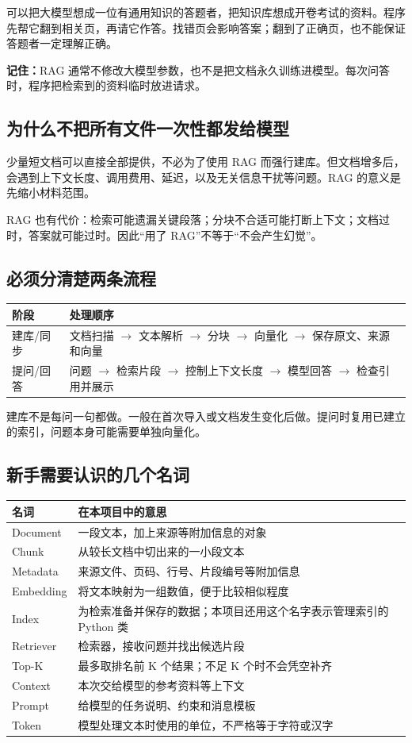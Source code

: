 \documentclass[UTF8,11pt,a4paper,fontset=fandol]{ctexart}
\newcommand{\important}[1]{\par\smallskip\noindent\textbf{记住：}#1\par\smallskip}
\begin{document}
可以把大模型想成一位有通用知识的答题者，把知识库想成开卷考试的资料。程序先帮它翻到相关页，再请它作答。找错页会影响答案；翻到了正确页，也不能保证答题者一定理解正确。

\important{RAG 通常不修改大模型参数，也不是把文档永久训练进模型。每次问答时，程序把检索到的资料临时放进请求。}

\subsection{为什么不把所有文件一次性都发给模型}
少量短文档可以直接全部提供，不必为了使用 RAG 而强行建库。但文档增多后，会遇到上下文长度、调用费用、延迟，以及无关信息干扰等问题。RAG 的意义是先缩小材料范围。

RAG 也有代价：检索可能遗漏关键段落；分块不合适可能打断上下文；文档过时，答案就可能过时。因此“用了 RAG”不等于“不会产生幻觉”。

\subsection{必须分清楚两条流程}
\begin{center}
\begin{tabular}{L{0.17\textwidth}L{0.7\textwidth}}
\toprule
阶段 & 处理顺序 \\
\midrule
建库/同步 & 文档扫描 $\rightarrow$ 文本解析 $\rightarrow$ 分块 $\rightarrow$ 向量化 $\rightarrow$ 保存原文、来源和向量 \\
提问/回答 & 问题 $\rightarrow$ 检索片段 $\rightarrow$ 控制上下文长度 $\rightarrow$ 模型回答 $\rightarrow$ 检查引用并展示 \\
\bottomrule
\end{tabular}
\end{center}

建库不是每问一句都做。一般在首次导入或文档发生变化后做。提问时复用已建立的索引，问题本身可能需要单独向量化。

\subsection{新手需要认识的几个名词}
\begin{longtable}{L{0.23\textwidth}L{0.65\textwidth}}
\toprule
名词 & 在本项目中的意思 \\
\midrule
Document & 一段文本，加上来源等附加信息的对象 \\
Chunk & 从较长文档中切出来的一小段文本 \\
Metadata & 来源文件、页码、行号、片段编号等附加信息 \\
Embedding & 将文本映射为一组数值，便于比较相似程度 \\
Index & 为检索准备并保存的数据；本项目还用这个名字表示管理索引的 Python 类 \\
Retriever & 检索器，接收问题并找出候选片段 \\
Top-K & 最多取排名前 K 个结果；不足 K 个时不会凭空补齐 \\
Context & 本次交给模型的参考资料等上下文 \\
Prompt & 给模型的任务说明、约束和消息模板 \\
Token & 模型处理文本时使用的单位，不严格等于字符或汉字 \\
\bottomrule
\end{longtable}
\end{document}
